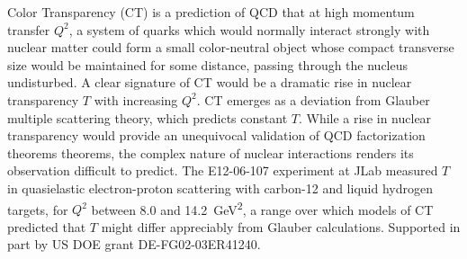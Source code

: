 \noindent
Color Transparency (CT) is a prediction of QCD that at high momentum transfer
$Q ^2$, a system of quarks which would normally interact strongly with nuclear
matter could form a small color-neutral object whose compact transverse size
would be maintained for some distance, passing through the nucleus undisturbed.
A clear signature of CT would be a dramatic rise in nuclear transparency $T$
with increasing $Q^2$.
CT emerges as a deviation from Glauber multiple scattering
theory, which predicts constant $T$.
While a rise in nuclear transparency would provide an unequivocal validation of
QCD factorization theorems theorems, the complex nature of nuclear
interactions renders its observation difficult to predict.
The E12-06-107 experiment at JLab measured $T$ in quasielastic electron-proton
scattering with carbon-12 and liquid hydrogen targets, for $Q^2$ between 8.0
and \SI{14.2}{\giga\electronvolt\squared}, a range over which models of CT
predicted that $T$ might differ appreciably from Glauber calculations.
Supported in part by US DOE grant DE-FG02-03ER41240.
